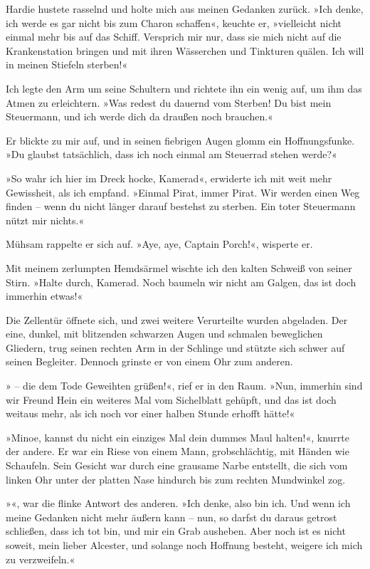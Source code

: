 Hardie hustete rasselnd und holte mich aus meinen Gedanken zurück.
»Ich denke, ich werde es gar nicht bis zum Charon schaffen«,
keuchte er, »vielleicht nicht einmal mehr bis auf das Schiff.
Versprich mir nur, dass sie mich nicht auf die Krankenstation
bringen und mit ihren Wässerchen und Tinkturen quälen. Ich will in
meinen Stiefeln sterben!«

Ich legte den Arm um seine Schultern und richtete ihn ein wenig
auf, um ihm das Atmen zu erleichtern. »Was redest du dauernd vom
Sterben! Du bist mein Steuermann, und ich werde dich da draußen
noch brauchen.«

Er blickte zu mir auf, und in seinen fiebrigen Augen glomm ein
Hoffnungsfunke. »Du glaubst tatsächlich, dass ich noch einmal am
Steuerrad stehen werde?«

»So wahr ich hier im Dreck hocke, Kamerad«, erwiderte ich mit weit
mehr Gewissheit, als ich empfand. »Einmal Pirat, immer Pirat. Wir
werden einen Weg finden – wenn du nicht länger darauf bestehst zu
sterben. Ein toter Steuermann nützt mir nichts.«

Mühsam rappelte er sich auf. »Aye, aye, Captain Porch!«, wisperte
er.

Mit meinem zerlumpten Hemdsärmel wischte ich den kalten Schweiß von
seiner Stirn. »Halte durch, Kamerad. Noch baumeln wir nicht am
Galgen, das ist doch immerhin etwas!«

\bigpar

Die Zellentür öffnete sich, und zwei weitere Verurteilte wurden
abgeladen. Der eine, dunkel, mit blitzenden schwarzen Augen und
schmalen beweglichen Gliedern, trug seinen rechten Arm in der
Schlinge und stützte sich schwer auf seinen Begleiter. Dennoch
grinste er von einem Ohr zum anderen.

» – die dem Tode Geweihten grüßen!«, rief
er in den Raum. »Nun, immerhin sind wir Freund Hein ein weiteres
Mal vom Sichelblatt gehüpft, und das ist doch weitaus mehr, als ich
noch vor einer halben Stunde erhofft hätte!«

»Minoe, kannst du nicht ein einziges Mal dein dummes Maul halten!«,
knurrte der andere. Er war ein Riese von einem Mann,
grobschlächtig, mit Händen wie Schaufeln. Sein Gesicht war durch
eine grausame Narbe entstellt, die sich vom linken Ohr unter der
platten Nase hindurch bis zum rechten Mundwinkel zog.

»«, war die flinke Antwort des anderen. »Ich
denke, also bin ich. Und wenn ich meine Gedanken nicht mehr äußern
kann – nun, so darfst du daraus getrost schließen, dass ich tot
bin, und mir ein Grab ausheben. Aber noch ist es nicht soweit, mein
lieber Alcester, und solange noch Hoffnung besteht, weigere ich
mich zu verzweifeln.«

